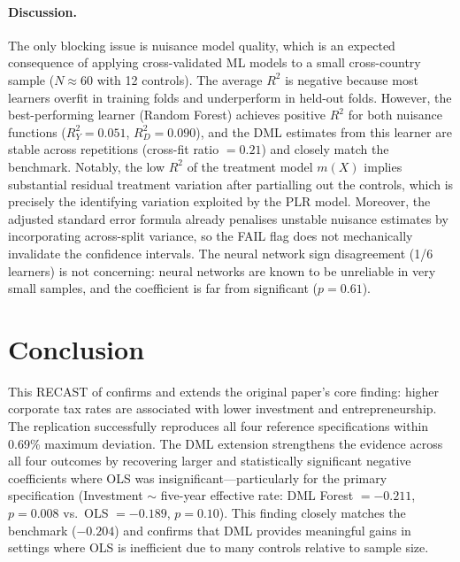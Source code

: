 \documentclass[12pt]{article}
\begin{document}
\paragraph{Discussion.}
The only blocking issue is nuisance model quality, which is an expected consequence
of applying cross-validated ML models to a small cross-country sample ($N \approx 60$
with 12 controls). The average $R^2$ is negative because most learners overfit in
training folds and underperform in held-out folds. However, the best-performing
learner (Random Forest) achieves positive $R^2$ for both nuisance functions
($R^2_Y = 0.051$, $R^2_D = 0.090$), and the DML estimates from this learner are
stable across repetitions (cross-fit ratio $= 0.21$) and closely match the
\citet{baiardi2024} benchmark. Notably, the low $R^2$ of the treatment model $m(X)$
implies substantial residual treatment variation after partialling out the controls,
which is precisely the identifying variation exploited by the PLR model. Moreover,
the \citet{baiardi2024} adjusted standard error formula already penalises unstable
nuisance estimates by incorporating across-split variance, so the FAIL flag does not
mechanically invalidate the confidence intervals. The neural network sign disagreement (1/6 learners)
is not concerning: neural networks are known to be unreliable in very small samples,
and the coefficient is far from significant ($p = 0.61$).

\section{Conclusion}

This RECAST of \citet{djankov2010} confirms and extends the original paper's core
finding: higher corporate tax rates are associated with lower investment and
entrepreneurship. The replication successfully reproduces all four reference
specifications within 0.69\% maximum deviation. The DML extension strengthens the
evidence across all four outcomes by recovering larger and statistically significant
negative coefficients where OLS was insignificant---particularly for the primary
specification (Investment $\sim$ five-year effective rate: DML Forest $= -0.211$,
$p = 0.008$ vs.\ OLS $= -0.189$, $p = 0.10$). This finding closely matches the
\citet{baiardi2024} benchmark ($-0.204$) and confirms that DML provides meaningful
gains in settings where OLS is inefficient due to many controls relative to sample
size.
\end{document}
